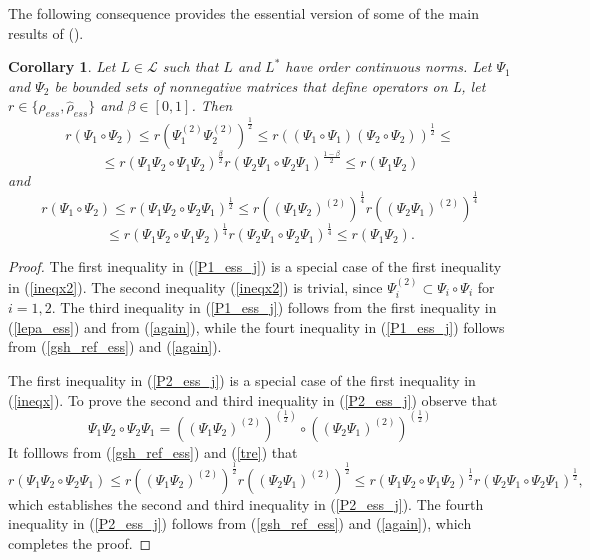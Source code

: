 \documentclass[12pt, reqno]{amsart}
\newtheorem{corollary}[theorem]{Corollary}
\theoremstyle{definition}
\theoremstyle{remark}
\numberwithin{equation}{section}
\newcommand{\be}{\begin{equation}}
\newcommand{\ee}{\end{equation}}
\begin{document}
The following consequence provides the essential version of some of  the main results of \cite{P12} (\cite[Theorems 3.5 and 3.7]{P12}).
\begin{corollary}Let $L\in \mathcal{L}$ such that %
$L$ and $L^*$ have order continuous norms. 
Let $\Psi _1$ and $\Psi _2$ be bounded sets of nonnegative matrices that define operators on L, let $r\in \{ \rho _{ess}, \hat{\rho} _{ess}\}$ and $\beta \in [0,1]$. Then  
$$
r (\Psi _1 \circ \Psi_2)  \le r (\Psi_1 ^{(2)} \Psi _2 ^{(2)})^{\frac{1}{2}} \le r ((\Psi_1 \circ \Psi_1)(\Psi _2 \circ \Psi _2))^{\frac{1}{2}}  \le  $$
\be
\le r(\Psi _1 \Psi _2\circ \Psi_1 \Psi_2)^{\frac{\beta}{2}} r(\Psi_2 \Psi_1 \circ \Psi_2\Psi_1)^{\frac{1-\beta}{2}} \le r(\Psi_1\Psi_2)
\label{P1_ess_j}
\ee
and
$$
r (\Psi_1 \circ \Psi_2) \le r (\Psi_1\Psi_2\circ \Psi_2\Psi_1)^{\frac{1}{2}} \le r((\Psi_1\Psi_2)^{(2)})^{\frac{1}{4}}r((\Psi_2\Psi_1)^{(2)})^{\frac{1}{4}} $$
\be
\le  r(\Psi_1\Psi_2\circ \Psi_1\Psi_2)^{\frac{1}{4}} r(\Psi_2\Psi_1 \circ \Psi_2\Psi_1)^{\frac{1}{4}} \le  r (\Psi_1\Psi_2).
\label{P2_ess_j}
\ee
\label{P12_cor}
\end{corollary}
\begin{proof} The first inequality in (\ref{P1_ess_j}) is a special case of the first inequality in (\ref{ineqx2}). The second inequality (\ref{ineqx2}) is trivial, since $\Psi_i ^{(2)} \subset \Psi _i \circ \Psi_i$ for $i=1,2$.  The third inequality in (\ref{P1_ess_j}) follows from the first inequality in (\ref{lepa_ess}) and from (\ref{again}), while the fourt inequality in (\ref{P1_ess_j}) follows from (\ref{gsh_ref_ess}) and  (\ref{again}).

The first inequality in (\ref{P2_ess_j}) is a special case of the first inequality in (\ref{ineqx}). To prove the second and third inequality in (\ref{P2_ess_j}) observe that
$$\Psi_1\Psi_2\circ \Psi_2\Psi_1 = ( (\Psi_1\Psi_2)^{(2)})^{(\frac{1}{2})}\circ ((\Psi_2\Psi_1)^{(2)})^{(\frac{1}{2})}$$
It folllows from  (\ref{gsh_ref_ess})  and (\ref{tre})  that 
$$ r (\Psi_1\Psi_2\circ \Psi_2\Psi_1) \le r((\Psi_1\Psi_2)^{(2)})^{\frac{1}{2}}r((\Psi_2\Psi_1)^{(2)})^{\frac{1}{2}} \le  r(\Psi_1\Psi_2\circ \Psi_1\Psi_2)^{\frac{1}{2}} r(\Psi_2\Psi_1 \circ \Psi_2\Psi_1)^{\frac{1}{2}}, $$
which establishes the second and third inequality in (\ref{P2_ess_j}). The fourth inequality in (\ref{P2_ess_j}) follows from (\ref{gsh_ref_ess}) and  (\ref{again}), which completes the proof.
\end{proof}
\end{document}
